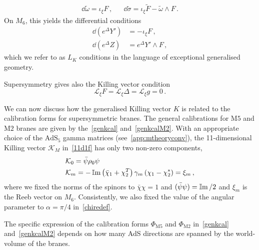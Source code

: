 \documentclass[debug]{phd}
\begin{document}
%
	\begin{align} \label{isom5}
		& &\dd  \tilde{\omega} = \iota_{\xi} F\, , & & \dd  \tilde{\sigma} = \iota_{\xi} \tilde{F} - \tilde{\omega} \wedge F\, . & &
	\end{align}
%
On $M_6$, this yields the differential conditions
%
	\begin{subequations}
	\label{eq:m-theory_structure_eqs}
		\begin{align}
			\dd  \left( e^{\Delta} Y'\right) &= - \iota_{\xi} F\, , \\[1mm]
			\dd  \left( e^{\Delta}Z\right) &= e^{\Delta} Y' \wedge F\, ,
		\end{align}
	\end{subequations}
%
which we refer to as $L_K$ conditions in the language of exceptional generalised geometry.
%

Supersymmetry gives also the Killing vector condition
%
	\begin{equation}
		\mathcal{L}_\xi F = \mathcal{L}_\xi \Delta = \mathcal{L}_\xi g = 0\, . 
	\end{equation}
% 
%

We can now discuss how the generalised Killing vector $K$ is related to the calibration forms for supersymmetric branes.
The general calibrations for $\mathrm{M}5$ and $\mathrm{M}2$ branes are given by the~\eqref{genkcal} and~\eqref{genkcalM2}. 
With an appropriate choice of the $\mathrm{AdS}_5$ gamma matrices (see~\cref{app:mtheoryconv}), the 11-dimensional Killing vector $\mathcal{K}_M$ in~\eqref{11d1f} has only two non-zero components,
\begin{subequations}
\begin{align}
& \mathcal{K}_0 = \bar{\psi} \rho_0 \psi \\
& \mathcal{K}_m = -\operatorname{\mathbb{I}m} \left(\bar{\chi}_1+\chi_2^T\right)\gamma_{m}\left(\chi_1 - \chi_2^* \right) = \xi_m \, ,
\end{align}
\end{subequations}
where we fixed the norms of the spinors to $\bar \chi \chi = 1$ and $(\bar{\psi}\psi) = \operatorname{\mathbb{I}m}/2$ and $\xi_m$ is the Reeb vector on $M_6$. Consistently, we also fixed the value of the angular parameter to $\alpha  = \pi/4$ in~\eqref{chiredef}.

The specific expression of the calibration forms $\Phi_{\mathrm{M}5}$ and $\Phi_{\mathrm{M}2}$ in~\eqref{genkcal} and~\eqref{genkcalM2} depends on how many AdS directions are spanned by the world-volume of the branes. 
\end{document}
